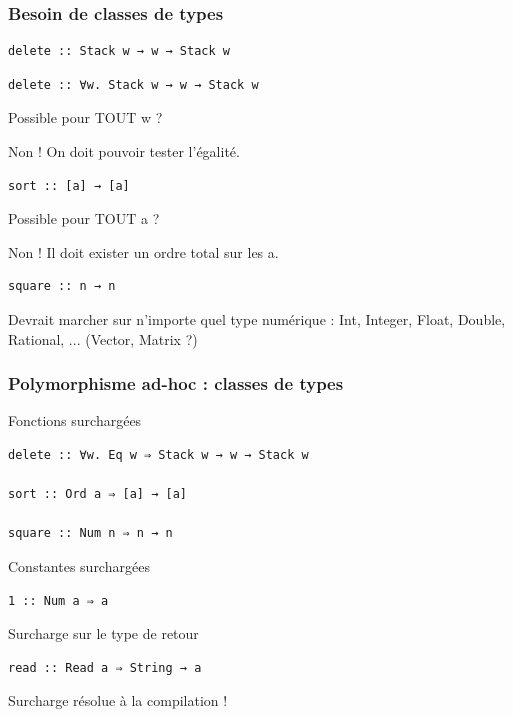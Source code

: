 \documentclass[10pt]{beamer}
\begin{document}
\begin{frame}[fragile]
\frametitle{Besoin de classes de types}
\begin{verbatim}
delete :: Stack w → w → Stack w
\end{verbatim}
\pause
\begin{verbatim}
delete :: ∀w. Stack w → w → Stack w
\end{verbatim}

Possible pour TOUT w ?

\pause

Non ! On doit pouvoir tester l'égalité.

\pause

\begin{verbatim}
sort :: [a] → [a]
\end{verbatim}

Possible pour TOUT a ?

\pause

Non ! Il doit exister un ordre total sur les a.

\pause

\begin{verbatim}
square :: n → n
\end{verbatim}

Devrait marcher sur n'importe quel type numérique : Int, Integer, Float,
Double, Rational, ... (Vector, Matrix ?)

\end{frame}




\begin{frame}[fragile]
\frametitle{Polymorphisme ad-hoc : classes de types}
\begin{block}
{Fonctions surchargées}
\begin{verbatim}
delete :: ∀w. Eq w ⇒ Stack w → w → Stack w

sort :: Ord a ⇒ [a] → [a]

square :: Num n ⇒ n → n
\end{verbatim}
\end{block}
\pause
\begin{block}
{Constantes surchargées}
\begin{verbatim}
1 :: Num a ⇒ a
\end{verbatim}
\end{block}
\pause
\begin{block}
{Surcharge sur le type de retour}
\begin{verbatim}
read :: Read a ⇒ String → a
\end{verbatim}
\end{block}
\pause
Surcharge résolue à la compilation !
\end{frame}
\end{document}
